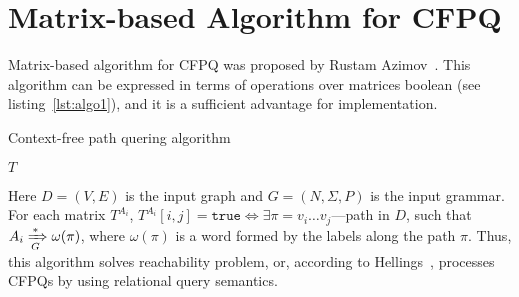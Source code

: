 \section{Matrix-based Algorithm for CFPQ}

Matrix-based algorithm for CFPQ was proposed by Rustam Azimov~\cite{Azimov:2018:CPQ:3210259.3210264}.
This algorithm can be expressed in terms of operations over matrices boolean (see listing~\ref{lst:algo1}), and it is a sufficient advantage for implementation.

\begin{algorithm}
\begin{algorithmic}[1]
\caption{Context-free path quering algorithm}
\label{lst:algo1}

        \EndFor
    \EndFor
    \EndFor

        \EndFor
    \EndWhile
\State \Return $T$
\EndFunction
\end{algorithmic}
\end{algorithm}

Here $D = (V, E)$ is the input graph and $G = (N,\Sigma,P)$ is the input grammar.
For each matrix $T^{A_i}$, $T^{A_i}[i,j] = \texttt{true} \iff \exists \pi = v_i \ldots v_j $---path in $D$, such that $A_i \xRightarrow[G]{*} \omega(\pi) $, where $\omega(\pi)$ is a word formed by the labels along the path $\pi$.
Thus, this algorithm solves reachability problem, or, according to Hellings~\cite{hellingsRelational}, processes CFPQs by using relational query semantics.

